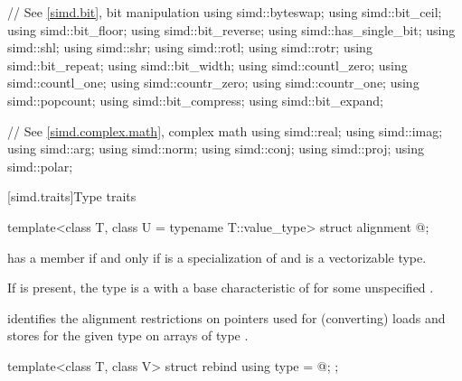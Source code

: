 \begin{codeblock}
{  // See \ref{simd.bit}, bit manipulation
  using simd::byteswap;
  using simd::bit_ceil;
  using simd::bit_floor;
  using simd::bit_reverse;
  using simd::has_single_bit;
  using simd::shl;
  using simd::shr;
  using simd::rotl;
  using simd::rotr;
  using simd::bit_repeat;
  using simd::bit_width;
  using simd::countl_zero;
  using simd::countl_one;
  using simd::countr_zero;
  using simd::countr_one;
  using simd::popcount;
  using simd::bit_compress;
  using simd::bit_expand;

  // See \ref{simd.complex.math},  complex math
  using simd::real;
  using simd::imag;
  using simd::arg;
  using simd::norm;
  using simd::conj;
  using simd::proj;
  using simd::polar;
}
\end{codeblock}

[simd.traits]{Type traits}

\begin{itemdecl}
template<class T, class U = typename T::value_type> struct alignment { @\seebelow@ };
\end{itemdecl}

\begin{itemdescr}
\pnum
{} has a member  if and only if
 is a specialization of  and
 is a vectorizable type.

\pnum
If  is present, the type  is a
 with a base characteristic of
 for some unspecified
.
\begin{note}
 identifies the alignment restrictions on pointers used for
(converting) loads and stores for the given type  on arrays of type
.
\end{note}
\end{itemdescr}

\begin{itemdecl}
template<class T, class V> struct rebind { using type = @\seebelow@; };
\end{itemdecl}

